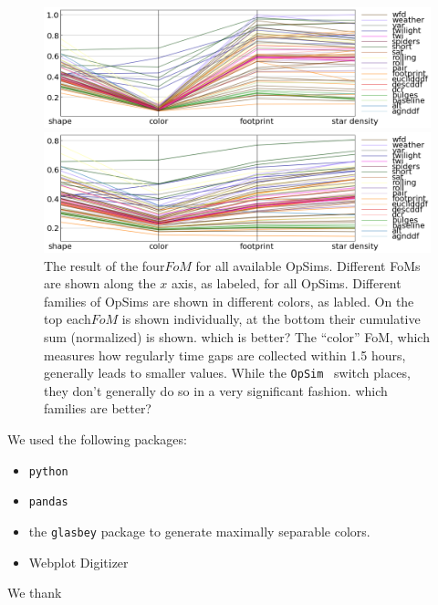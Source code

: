 \documentclass[onecolumn, 10pt]{aastex63}
\newcommand{\question}[1]{{\color{red} #1}}
\newcommand{\opsim}{\texttt{OpSim}}
\begin{document}
\begin{center}
\begin{figure}[t!]
\centering
\includegraphics[scale=0.5
]{figures/opsimParallelCoord.png}

\includegraphics[scale=0.5]{figures/opsimParallelCoord_cum.png}
\caption{The result of the four$FoM$ for all available OpSims. Different FoMs are shown along the $x$ axis, as labeled, for all OpSims. Different families of OpSims are shown in different colors, as labled. On the top each$FoM$ is shown individually, at the bottom their cumulative sum (normalized) is shown. \question{which is better?} The ``color'' FoM, which measures how regularly time gaps are collected within 1.5 hours, generally leads to smaller values. While the \opsim~ switch places, they don't generally do so in  a very significant fashion. \question{which families are better?}}
\label{fig:opsimPC}
\end{figure}
\end{center}


\acknowledgments
We used the following packages:
\begin{itemize}
\item{\texttt{python}}
\item{\texttt{pandas}}
\item{the \texttt{glasbey} package to generate maximally separable colors. \citep{glasbey2007colour}}
\item{Webplot Digitizer \citep{digitizer}}
\end{itemize}
We thank 



%
\end{document}
